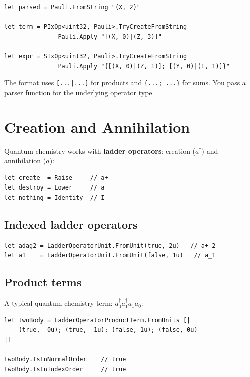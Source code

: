 \documentclass[10pt,a4paper]{article}
\begin{document}
\begin{lstlisting}
let parsed = Pauli.FromString "(X, 2)"

let term = PIxOp<uint32, Pauli>.TryCreateFromString
               Pauli.Apply "[(X, 0)|(Z, 3)]"

let expr = SIxOp<uint32, Pauli>.TryCreateFromString
               Pauli.Apply "{[(X, 0)|(Z, 1)]; [(Y, 0)|(I, 1)]}"
\end{lstlisting}

The format uses \texttt{[...|...]} for products and \texttt{\{...;~...\}}
for sums.  You pass a parser function for the underlying operator type.


\section{Creation and Annihilation}\label{ch:ladder}

Quantum chemistry works with \textbf{ladder operators}: creation
($a^\dagger$) and annihilation ($a$):

\begin{lstlisting}
let create  = Raise     // a+
let destroy = Lower     // a
let nothing = Identity  // I
\end{lstlisting}

\subsection{Indexed ladder operators}

\begin{lstlisting}
let adag2 = LadderOperatorUnit.FromUnit(true, 2u)   // a+_2
let a1    = LadderOperatorUnit.FromUnit(false, 1u)   // a_1
\end{lstlisting}

\subsection{Product terms}

A typical quantum chemistry term: $a^\dagger_0 a^\dagger_1 a_1 a_0$:

\begin{lstlisting}
let twoBody = LadderOperatorProductTerm.FromUnits [|
    (true,  0u); (true,  1u); (false, 1u); (false, 0u)
|]

twoBody.IsInNormalOrder    // true
twoBody.IsInIndexOrder     // true
\end{lstlisting}
\end{document}
